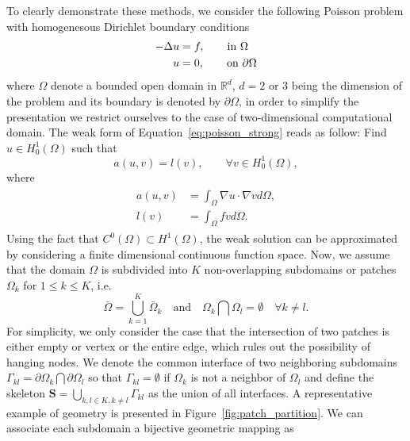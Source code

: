 \documentclass[preprint,12pt]{elsarticle}
\theoremstyle{remark}
\begin{document}
To clearly demonstrate these methods, we consider the following Poisson problem with homogenesous Dirichlet boundary conditions
\begin{align}
    \begin{split}
        -\Delta{u}&=f, \qquad \textnormal{in $\Omega$}\\
        u&=0, \qquad \textnormal{on $\partial\Omega$}
    \end{split}\label{eq:poisson_strong}
\end{align}
where $\Omega$ denote a bounded open domain in $\mathbb{R}^d$, $d=2$ or $3$ being the dimension of the problem and its boundary is denoted by $\partial{\Omega}$, in order to simplify the presentation we restrict ourselves to the case of two-dimensional computational domain. The weak form of Equation~\eqref{eq:poisson_strong} reads as follow: Find $u\in{H^1_0(\Omega)}$ such that
\begin{equation}
    a(u,v)=l(v), \qquad \forall v\in{H^1_0(\Omega)},\label{eq:poisson_weak}
\end{equation}
where 
\begin{align}
    \begin{split}
        a(u,v)&=\int_{\Omega}\nabla{u}\cdot\nabla{v}d\Omega,\\
        l(v)&=\int_{\Omega}fvd\Omega.
    \end{split}
\end{align}
Using the fact that $C^0(\Omega)\subset{}H^1(\Omega)$, the weak solution can be approximated by considering a finite dimensional continuous function space. Now, we assume that the domain $\Omega$ is subdivided into $K$ non-overlapping subdomains or patches $\Omega_k$ for $1\leq{k}\leq{K}$, i.e.\ 
\begin{equation}
\bar{\Omega} = \bigcup_{k=1}^{K} \bar{\Omega}_{k}  \quad \textrm{and} \quad {\Omega}_{k}\bigcap{\Omega}_{l}=\emptyset \quad \forall k\neq{l}.
\end{equation}
For simplicity, we only consider the case that the intersection of two patches is either empty or vertex or the entire edge, which rules out the possibility of hanging nodes. We denote the common interface of two neighboring subdomains $\Gamma_{kl}=\partial{\Omega}_k\bigcap\partial{\Omega}_l$ so that $\Gamma_{kl}=\emptyset$ if $\Omega_k$ is not a neighbor of $\Omega_l$ and define the skeleton $\mathbf{S}=\bigcup_{k,l\in{K}, k\neq{l}}\Gamma_{kl}$ as the union of all interfaces. A representative example of geometry is presented in Figure~\ref{fig:patch_partition}. We can associate each subdomain a bijective geometric mapping as
\end{document}
